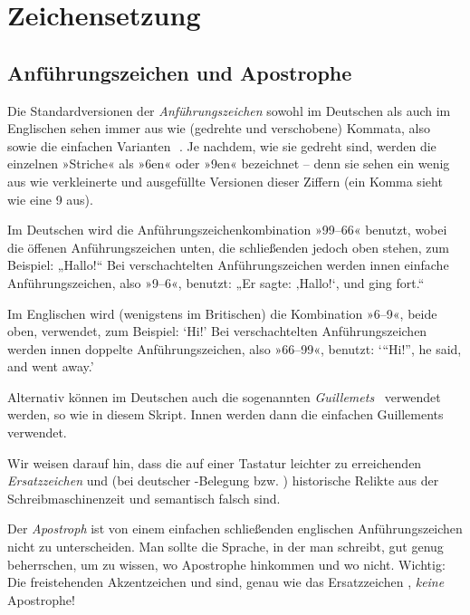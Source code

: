 \chapter{Zeichensetzung}

\lipsum[1]

\section{Anführungszeichen und Apostrophe}

Die Standardversionen der \emph{Anführungszeichen} sowohl im Deutschen
als auch im Englischen sehen immer aus wie (gedrehte und verschobene)
Kommata, also \,\, sowie die einfachen
Varianten \,\,.  Je nachdem, wie sie gedreht
sind, werden die einzelnen »Striche« als »6en« oder »9en« bezeichnet
-- denn sie sehen ein wenig aus wie verkleinerte und ausgefüllte
Versionen dieser Ziffern (ein Komma \Char{,} sieht wie eine 9 aus).

Im Deutschen wird die Anführungszeichenkombination »99–66« benutzt, wobei die
öffenen Anführungszeichen unten, die schließenden jedoch oben stehen, zum
Beispiel: „Hallo!“ Bei verschachtelten Anführungszeichen werden innen einfache
Anführungszeichen, also »9–6«, benutzt: „Er sagte: ‚Hallo!{‘}, und ging fort.“

Im Englischen wird (wenigstens im Britischen) die Kombination »6–9«,
beide oben, verwendet, zum Beispiel: \foreignlanguage{british}{‘Hi!’}
Bei verschachtelten Anführungszeichen werden innen doppelte
Anführungszeichen, also »66–99«, benutzt:
\foreignlanguage{british}{‘“Hi!”, he said, and went away.’}

Alternativ können im Deutschen auch die sogenannten \emph{Guillemets}
\, verwendet werden, so wie in diesem Skript.  Innen
werden dann die einfachen Guillements \, verwendet.

Wir weisen darauf hin, dass die auf einer Tastatur leichter zu
erreichenden \emph{Ersatzzeichen}  und \Char{\textquotesingle}
(bei deutscher -Belegung 
bzw. \keys{\shift+\#}) historische Relikte aus der
Schreibmaschinenzeit und semantisch falsch sind.

Der \emph{Apostroph}  ist von einem einfachen schließenden englischen
Anführungszeichen nicht zu unterscheiden.  Man sollte die Sprache, in der
man schreibt, gut genug beherrschen, um zu wissen, wo Apostrophe hinkommen und
wo nicht.  Wichtig: Die freistehenden Akzentzeichen
\Char{\textasciigrave} und  sind, genau wie das Ersatzzeichen
\Char{\textquotesingle}, \emph{keine} Apostrophe!


